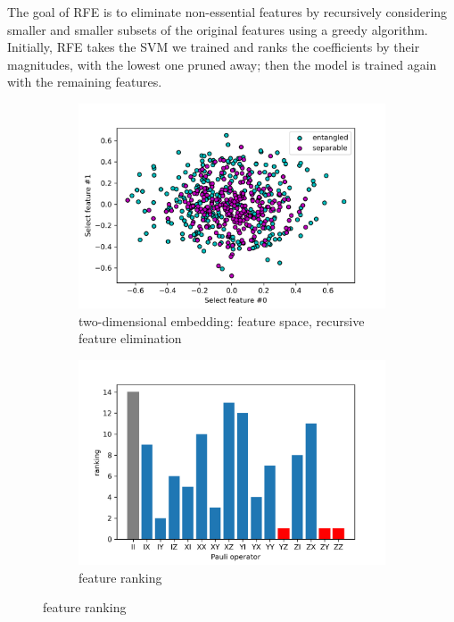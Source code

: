 \documentclass[
10pt,
aps,
pra,
linenumbers,
floatfix,
]{revtex4-2}
\theoremstyle{plain}
\theoremstyle{definition}
\begin{document}
The goal of RFE is to eliminate non-essential features by recursively considering smaller and smaller subsets of the original features using a greedy algorithm. Initially, RFE takes the SVM we trained and ranks the coeﬃcients by their magnitudes, with the lowest one pruned away; then the model is trained again with the remaining features.
\begin{figure}[!ht]
	\centering
	\begin{subfigure}{0.49\textwidth}
	\centering
		\includegraphics[width=.9\linewidth]{./notebook/feature_space_2.png}
		\caption{two-dimensional embedding: feature space, recursive feature elimination}
	\end{subfigure}
	\begin{subfigure}{0.49\textwidth}
	\centering
		\includegraphics[width=.9\linewidth]{./notebook/feature_rank.png}
		\caption{feature ranking}
	\end{subfigure}
\end{figure}
\end{document}
